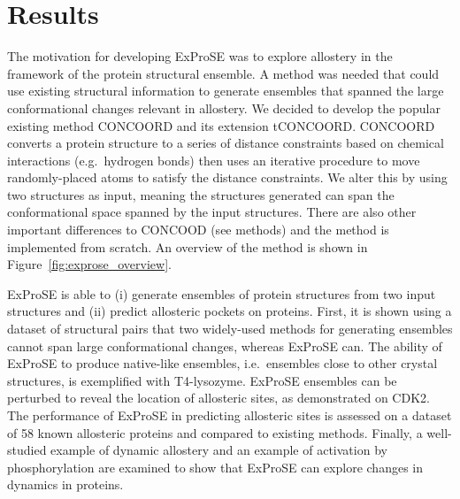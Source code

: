 \section{Results}
\label{sec:exprose_results}

The motivation for developing ExProSE was to explore allostery in the framework of the protein structural ensemble.
A method was needed that could use existing structural information to generate ensembles that spanned the large conformational changes relevant in allostery.
We decided to develop the popular existing method CONCOORD and its extension tCONCOORD.
CONCOORD converts a protein structure to a series of distance constraints based on chemical interactions (e.g.\ hydrogen bonds) then uses an iterative procedure to move randomly-placed atoms to satisfy the distance constraints.
We alter this by using two structures as input, meaning the structures generated can span the conformational space spanned by the input structures.
There are also other important differences to CONCOOD (see methods) and the method is implemented from scratch.
An overview of the method is shown in Figure~\ref{fig:exprose_overview}.

ExProSE is able to (i) generate ensembles of protein structures from two input structures and (ii) predict allosteric pockets on proteins.
First, it is shown using a dataset of structural pairs that two widely-used methods for generating ensembles cannot span large conformational changes, whereas ExProSE can.
The ability of ExProSE to produce native-like ensembles, i.e.\ ensembles close to other crystal structures, is exemplified with T4-lysozyme.
ExProSE ensembles can be perturbed to reveal the location of allosteric sites, as demonstrated on CDK2.
The performance of ExProSE in predicting allosteric sites is assessed on a dataset of 58 known allosteric proteins and compared to existing methods.
Finally, a well-studied example of dynamic allostery and an example of activation by phosphorylation are examined to show that ExProSE can explore changes in dynamics in proteins.


